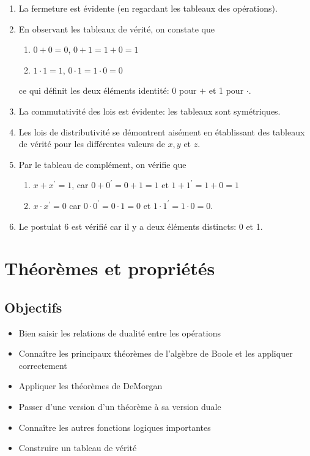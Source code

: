 \documentclass[letter, oneside]{book}
\begin{document}
\begin{enumerate}
\item La fermeture est évidente (en regardant les tableaux des opérations).

\item En observant les tableaux de vérité, on constate que

\begin{enumerate}
\item \(0 + 0 = 0\), \(0 + 1 = 1 + 0 = 1\)

\item \(1 \cdot 1 = 1\), \(0 \cdot 1 = 1 \cdot 0 = 0\)
\end{enumerate}

ce qui définit les deux éléments identité: 0 pour \(+\) et 1 pour  \(\cdot\).

\item La commutativité des lois est évidente: les tableaux sont
symétriques.

\item Les lois de distributivité se démontrent aisément en établissant des
tableaux de vérité pour les différentes valeurs de \(x, y\) et \(z\).

\item Par le tableau de complément, on vérifie que

\begin{enumerate}
\item \(x + x^{\prime} = 1\), car \(0 + 0^{\prime} = 0 + 1 = 1\) et \(1 +
        1^{\prime} = 1+ 0 = 1\)

\item \(x \cdot x^{\prime} = 0\) car \(0 \cdot 0^{\prime} = 0 \cdot 1 =
        0\) et \(1 \cdot 1^{\prime} = 1 \cdot 0 = 0\).
\end{enumerate}

\item Le postulat 6 est vérifié car il y a deux éléments distincts: 0 et 1.
\end{enumerate}

\chapter{Théorèmes et propriétés}
\label{sec:orgbb8332e}
\section{Objectifs}
\label{sec:orgea13b79}
\begin{itemize}
\item Bien saisir les relations de dualité entre les opérations
\item Connaître les principaux théorèmes de l'algèbre de Boole et
les appliquer correctement
\item Appliquer les théorèmes de DeMorgan
\item Passer d'une version d'un théorème à sa version duale
\item Connaître les autres fonctions logiques importantes
\item Construire un tableau de vérité
\end{itemize}
\end{document}
